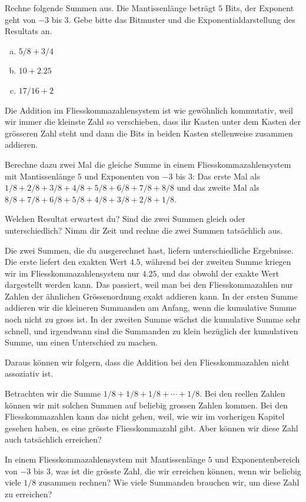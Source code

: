 \begin{aufgabe}\label{addition}
Rechne folgende Summen aus. Die Mantissenlänge beträgt \(5\) Bits, der Exponent geht von \(-3\) bis \(3\). Gebe bitte das Bitmuster und die Exponentialdarstellung des Resultats an.
\begin{enumerate}[(a)]
\item \(5/8 + 3/4\)
\item \(10 + 2.25\)
\item \(17/16 + 2\)
\end{enumerate}
\end{aufgabe}

Die Addition im Fliesskommazahlensystem ist wie gewöhnlich kommutativ, weil wir immer die kleinste Zahl so verschieben, dass ihr Kasten unter dem Kasten der grösseren Zahl steht und dann die Bits in beiden Kasten stellenweise zusammen addieren.

\begin{aufgabe}\label{lernaufgabe_assoziativ}
Berechne dazu zwei Mal die gleiche Summe in einem Fliesskommazahlensystem mit Mantissenlänge \(5\) und Exponenten von \(-3\) bis \(3\):
Das erste Mal als \(1/8 + 2/8 + 3/8 + 4/8 + 5/8 + 6/8 + 7/8 + 8/8\) und das zweite Mal als \(8/8 + 7/8 + 6/8 + 5/8 + 4/8 + 3/8 + 2/8 + 1/8\).

Welchen Resultat erwartest du? Sind die zwei Summen gleich oder unterschiedlich?
Nimm dir Zeit und rechne die zwei Summen tatsächlich aus.
\end{aufgabe}

Die zwei Summen, die du ausgerechnet hast, liefern unterschiedliche Ergebnisse. Die erste liefert den exakten Wert \(4.5\), während bei der zweiten Summe kriegen wir im Fliesskommazahlensystem nur \(4.25\), und das obwohl der exakte Wert dargestellt werden kann. Das passiert, weil man bei den Fliesskommazahlen nur Zahlen der ähnlichen Grössenordnung exakt addieren kann. In der ersten Summe addieren wir die kleineren Summanden am Anfang, wenn die kumulative Summe noch nicht zu gross ist. In der zweiten Summe wächst die kumulative Summe sehr schnell, und irgendwann sind die Summanden zu klein bezüglich der kumulativen Summe, um einen Unterschied zu machen.

Daraus können wir folgern, dass die Addition bei den Fliesskommazahlen nicht assoziativ ist.


\begin{aufgabe}\label{ein_achtel}
Betrachten wir die Summe \(1/8 + 1/8 + 1/8 + \dotsb + 1/8\).
Bei den reellen Zahlen können wir mit solchen Summen auf beliebig grossen Zahlen kommen. Bei den Fliesskommazahlen kann das nicht gehen, weil, wie wir im vorherigen Kapitel gesehen haben, es eine grösste Fliesskommazahl gibt. Aber können wir diese Zahl auch tatsächlich erreichen?

In einem Fliesskommazahlensystem mit Mantissenlänge \(5\) und Exponentenbereich von \(-3\) bis \(3\), was ist die grösste Zahl, die wir erreichen können, wenn wir beliebig viele \(1/8\) zusammen rechnen? Wie viele Summanden brauchen wir, um diese Zahl zu erreichen?
\end{aufgabe}


